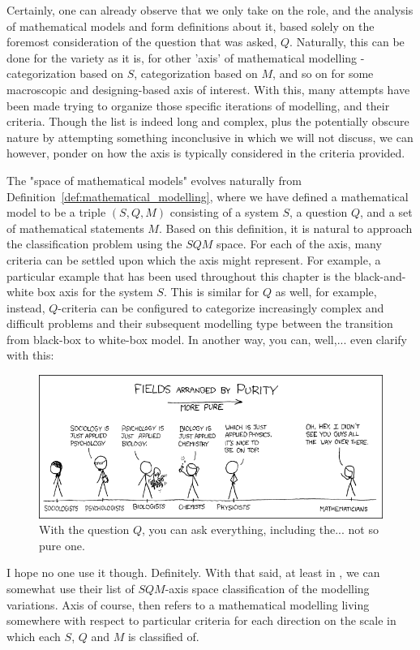 Certainly, one can already observe that we only take on the role, and the analysis of mathematical models and form definitions about it, based solely on the foremost consideration of the question that was asked, $Q$. Naturally, this can be done for the variety as it is, for other 'axis' of mathematical modelling - categorization based on $S$, categorization based on $M$, and so on for some macroscopic and designing-based axis of interest. With this, many attempts have been made trying to organize those specific iterations of modelling, and their criteria. Though the list is indeed long and complex, plus the potentially obscure nature by attempting something inconclusive in which we will not discuss, we can however, ponder on how the axis is typically considered in the criteria provided. 

The "space of mathematical models" evolves naturally from Definition~\ref{def:mathematical_modelling}, where we have defined a mathematical model to be a triple $(S,Q,M)$ consisting of a system $S$, a question $Q$, and a set of mathematical statements $M$. Based on this definition, it is natural to approach the classification problem using the $SQM$ space. For each of the axis, many criteria can be settled upon which the axis might represent. For example, a particular example that has been used throughout this chapter is the black-and-white box axis for the system $S$. This is similar for $Q$ as well, for example, instead, $Q$-criteria can be configured to categorize increasingly complex and difficult problems and their subsequent modelling type between the transition from black-box to white-box model. In another way, you can, well,... even clarify with this: 

\begin{figure}[h!]
    \centering
    \includegraphics[width=\textwidth]{img/purityxkcd.png}
    \caption{With the question $Q$, you can ask everything, including the... not so pure one.}
\end{figure}
I hope no one use it though. Definitely. With that said, at least in \cite{VeltenetalMathematicalModelling}, we can somewhat use their list of $SQM$-axis space classification of the modelling variations. Axis of course, then refers to a mathematical modelling living somewhere with respect to particular criteria for each direction on the scale in which each $S$, $Q$ and $M$ is classified of. 
